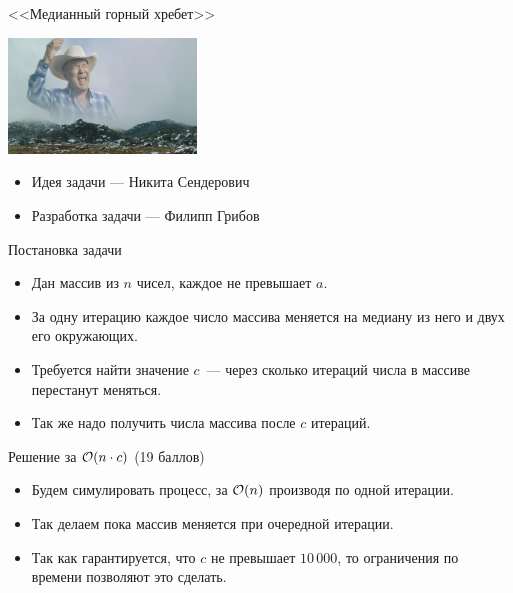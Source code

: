 \begin{frame}
  \begin{center}
    \LARGE <<Медианный горный хребет>>
  \end{center}

\begin{center}
	\includegraphics[width=5cm]{memes/c-meme.jpg}
\end{center}

  \begin{itemize}
  \item Идея задачи --- Никита Сендерович
  \item Разработка задачи --- Филипп Грибов
  \end{itemize}

\end{frame}

\begin{frame}{Постановка задачи}

  \begin{itemize}
  \item Дан массив из $n$ чисел, каждое не превышает $a$.
  \item За одну итерацию каждое число массива меняется на медиану из него и двух его окружающих.
  \item Требуется найти значение $c$~--- через сколько итераций числа в массиве перестанут меняться.
  \item Так же надо получить числа массива после $c$ итераций.
  \end{itemize}
  
\end{frame}

\begin{frame}{Решение за $\mathcal{O}(n \cdot c)$ (19 баллов)}
  \begin{itemize}
  \item Будем симулировать процесс, за $\mathcal{O}(n)$ производя по одной итерации.
  \item Так делаем пока массив меняется при очередной итерации.
  \item Так как гарантируется, что $c$ не превышает $10\,000$, то ограничения по времени позволяют это сделать.
  \end{itemize}
\end{frame}

